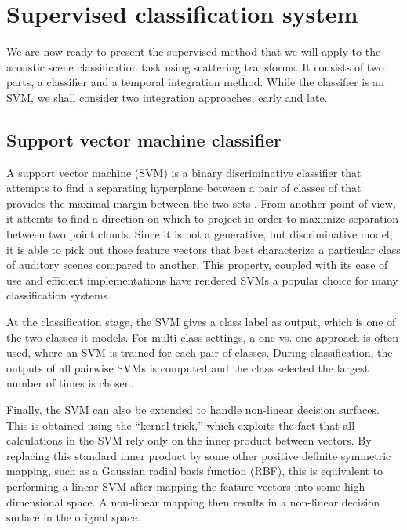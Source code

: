 \documentclass[journal]{IEEEtran}
\makeatletter
\newcommand*{\vs}{vs.\@\xspace}
\makeatother
\begin{document}
\section{Supervised classification system}
\label{sec:supervised}

We are now ready to present the supervised method that we will apply to the acoustic scene classification task using scattering transforms. It consists of two parts, a classifier and a temporal integration method. While the classifier is an SVM, we shall consider two integration approaches, early and late.

\subsection{Support vector machine classifier}
\label{sec:svm}

A support vector machine (SVM) is a binary discriminative classifier that attempts to find a separating hyperplane between a pair of classes of that provides the maximal margin between the two sets \cite{Cortes1995}. From another point of view, it attemts to find a direction on which to project in order to maximize separation between two point clouds. Since it is not a generative, but discriminative model, it is able to pick out those feature vectors that best characterize a particular class of auditory scenes compared to another. This property, coupled with its ease of use and efficient implementations \cite{libsvm} have rendered SVMs a popular choice for many classification systems.

At the classification stage, the SVM gives a class label as output, which is one of the two classes it models. For multi-class settings, a one-\vs-one approach is often used, where an SVM is trained for each pair of classes. During classification, the outputs of all pairwise SVMs is computed and the class selected the largest number of times is chosen.

Finally, the SVM can also be extended to handle non-linear decision surfaces. This is obtained using the ``kernel trick,'' which exploits the fact that all calculations in the SVM rely only on the inner product between vectors. By replacing this standard inner product by some other positive definite symmetric mapping, such as a Gaussian radial basis function (RBF), this is equivalent to performing a linear SVM after mapping the feature vectors into some high-dimensional space. A non-linear mapping then results in a non-linear decision surface in the orignal space.
\end{document}
